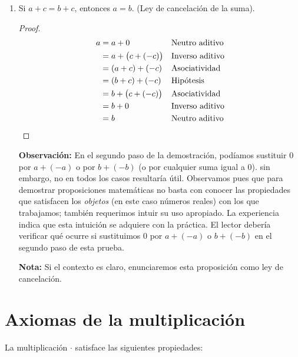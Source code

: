 \documentclass[11pt]{article}
\begin{document}
\begin{enumerate}[label=\alph*)]
    \item Si $a+c=b+c$, entonces $a=b$. (Ley de cancelación de la suma).
    \vspace{-1em}\begin{proof} 
    \begin{align*}
        a &= a+0 && \text{Neutro aditivo}\\
        &= a+ \bigl(c+(-c)\bigr) && \text{Inverso aditivo}\\
        &= (a+c) + (-c) && \text{Asociatividad}\\
        &= (b+c) + (-c) && \text{Hipótesis}\\
        &= b + \bigl(c+(-c)\bigr) && \text{Asociatividad}\\
        &= b + 0 && \text{Inverso aditivo}\\
        &= b &&\text{Neutro aditivo} \qedhere
    \end{align*}    
\end{proof} \vspace{-1em}

\textbf{Observación:} En el segundo paso de la demostración, podíamos sustituir $0$ por $a+(-a)$ o por $b+(-b)$ (o por cualquier suma igual a $0$). sin embargo, no en todos los casos resultaría útil. Observamos pues que para demostrar proposiciones matemáticas no basta con conocer las propiedades que satisfacen los \textit{objetos} (en este caso números reales) con los que trabajamos; también requerimos intuir su uso apropiado. La experiencia indica que esta intuición se adquiere con la práctica. El lector debería verificar qué ocurre si sustituimos $0$ por $a+(-a)$ o $b+(-b)$ en el segundo paso de esta prueba.

\textbf{Nota:} Si el contexto es claro, enunciaremos esta proposición como ley de cancelación.
\end{enumerate}

\pagebreak

\section*{Axiomas de la multiplicación}
La multiplicación $\cdot$ satisface las siguientes propiedades:
\end{document}
